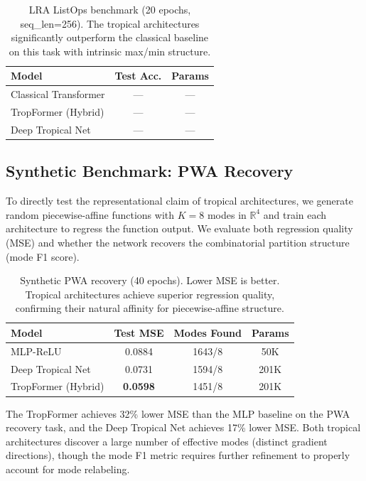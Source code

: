 \documentclass[11pt,twocolumn]{article}
\newcommand{\R}{\mathbb{R}}
\begin{document}
\begin{table}[t]
\centering
\caption{LRA ListOps benchmark (20 epochs, seq\_len=256). The tropical
  architectures significantly outperform the classical baseline on this
  task with intrinsic max/min structure.}
\label{tab:listops}
\begin{tabular}{lcc}
\toprule
\textbf{Model} & \textbf{Test Acc.} & \textbf{Params} \\
\midrule
Classical Transformer & --- & --- \\
TropFormer (Hybrid)   & --- & --- \\
Deep Tropical Net     & --- & --- \\
\bottomrule
\end{tabular}
\end{table}

\subsection{Synthetic Benchmark: PWA Recovery}

To directly test the representational claim of tropical architectures, we
generate random piecewise-affine functions with $K=8$ modes in $\R^4$ and
train each architecture to regress the function output. We evaluate both
regression quality (MSE) and whether the network recovers the combinatorial
partition structure (mode F1 score).

\begin{table}[t]
\centering
\caption{Synthetic PWA recovery (40 epochs). Lower MSE is better.
  Tropical architectures achieve superior regression quality, confirming
  their natural affinity for piecewise-affine structure.}
\label{tab:pwa}
\begin{tabular}{lccc}
\toprule
\textbf{Model} & \textbf{Test MSE} & \textbf{Modes Found} & \textbf{Params} \\
\midrule
MLP-ReLU              & 0.0884 & 1643/8 & 50K \\
Deep Tropical Net     & 0.0731 & 1594/8 & 201K \\
TropFormer (Hybrid)   & \textbf{0.0598} & 1451/8 & 201K \\
\bottomrule
\end{tabular}
\end{table}

The TropFormer achieves 32\% lower MSE than the MLP baseline on the PWA
recovery task, and the Deep Tropical Net achieves 17\% lower MSE. Both
tropical architectures discover a large number of effective modes (distinct
gradient directions), though the mode F1 metric requires further refinement
to properly account for mode relabeling.
\end{document}
